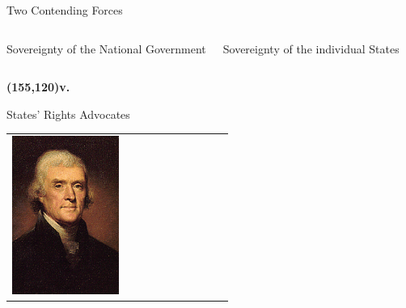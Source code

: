 \begin{frame}{Two Contending Forces}
    \begin{columns}[onlytextwidth]
            \begin{varblock}[0.9\textwidth]{}\huge{Sovereignty of the National Government}\end{varblock}

            \begin{varblock}[0.9\textwidth]{}\huge{Sovereignty of the individual States}\end{varblock}
    \end{columns}
    \textbf{\huge{ \color{red}
        \Put(155,120){v.}
    }}
\end{frame}

\begin{frame}{States' Rights Advocates}
\begin{table}[h]
\centering
\begin{tabular}{lcccccc} 
    \includegraphics[width=0.75\textwidth,height=.3\textheight,keepaspectratio=true]{img/jefferson.png} &

\end{tabular}
\end{table}
\end{frame}
